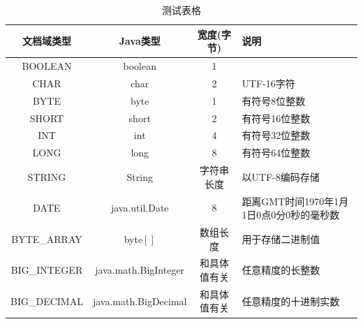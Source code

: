 \documentclass[bachelor,winfonts]{jnuthesis}
\begin{document}
    \begin{table}
        \centering
        \begin{tabular}{cccp{38mm}}
            \toprule
            \textbf{文档域类型} & \textbf{Java类型} & \textbf{宽度(字节)} & \textbf{说明} \\
            \midrule
            BOOLEAN  & boolean &  1  & \\
            CHAR     & char    &  2  & UTF-16字符 \\
            BYTE     & byte    &  1  & 有符号8位整数 \\
            SHORT    & short   &  2  & 有符号16位整数 \\
            INT      & int     &  4  & 有符号32位整数 \\
            LONG     & long    &  8  & 有符号64位整数 \\
            STRING   & String  &  字符串长度  & 以UTF-8编码存储 \\
            DATE     & java.util.Date & 8 & 距离GMT时间1970年1月1日0点0分0秒的毫秒数 \\
            BYTE\_ARRAY & byte$[]$ & 数组长度 & 用于存储二进制值 \\
            BIG\_INTEGER & java.math.BigInteger & 和具体值有关 & 任意精度的长整数 \\
            BIG\_DECIMAL & java.math.BigDecimal & 和具体值有关 & 任意精度的十进制实数 \\
            \bottomrule
        \end{tabular}
        \caption{测试表格}\label{table:test4}
    \end{table}
    
\end{document}
